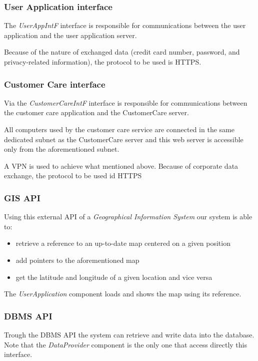 \subsubsection{User Application interface}
The \emph{UserAppIntF} interface is responsible for communications between the user application and the user application server.

Because of the nature of exchanged data (credit card number, password, and privacy-related information), the protocol to be used is HTTPS.

\subsubsection{Customer Care interface}
Via the \emph{CustomerCareIntF} interface is responsible for communications between the customer care application and the CustomerCare server.

All computers used by the customer care service are connected in the same dedicated subnet as the CustomerCare server and this web server is accessible only from the aforementioned subnet. 

A VPN is used to achieve what mentioned above. Because of corporate data exchange, the protocol to be used id HTTPS

\subsubsection{GIS API}
\label{sec:gis}
Using this external API of a \emph{Geographical Information System} our system is able to:
\begin{itemize}
	\item retrieve a reference to an up-to-date map centered on a given position
	\item add pointers to the aforementioned map
	\item get the latitude and longitude of a given location and vice versa
\end{itemize}
The \emph{UserApplication} component loads and shows the map using its reference.

\subsubsection{DBMS API}
Trough the DBMS API the system can retrieve and write data into the database. Note that the \mbox{\emph{DataProvider}} component is the only one that access directly this interface.

